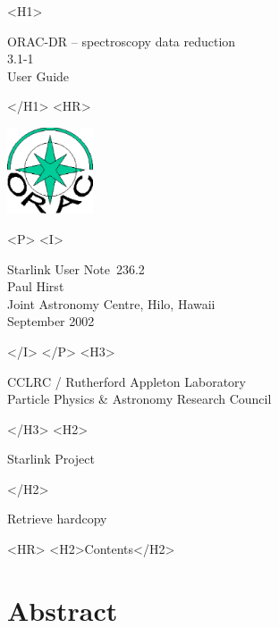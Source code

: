 \documentclass[twoside,11pt]{article}
\newcommand{\stardoccategory}  {Starlink User Note}
\newcommand{\stardocsource}    {sun\stardocnumber}
\newcommand{\stardocnumber}    {236.2}
\newcommand{\stardocauthors}   {Paul Hirst \\
                                Joint Astronomy Centre, Hilo, Hawaii}
\newcommand{\stardocdate}      {September 2002}
\newcommand{\stardoctitle}     {ORAC-DR -- spectroscopy data reduction}
\newcommand{\stardocversion}   {3.1-1}
\newcommand{\stardocmanual}    {User Guide}
\newcommand{\htmladdnormallink}[2]{#1}
\newcommand{\htmladdimg}[1]{}
\newcommand{\htmlref}[2]{#1}
\newcommand{\htmladdtonavigation}[1]{}
\newcommand{\xlabel}[1]{}
\renewcommand{\_}{\texttt{\symbol{95}}}
\begin{document}
\begin{htmlonly}
   \xlabel{}
   \begin{rawhtml} <H1> \end{rawhtml}
      \stardoctitle\\
      \stardocversion\\
      \stardocmanual
   \begin{rawhtml} </H1> <HR> \end{rawhtml}

\includegraphics[width=1.0in]{sun236_logo.eps}

   \begin{rawhtml} <P> <I> \end{rawhtml}
   \stardoccategory\ \stardocnumber \\
   \stardocauthors \\
   \stardocdate
   \begin{rawhtml} </I> </P> <H3> \end{rawhtml}
      \htmladdnormallink{CCLRC / Rutherford Appleton Laboratory}
                        {http://www.cclrc.ac.uk} \\
      \htmladdnormallink{Particle Physics \& Astronomy Research Council}
                        {http://www.pparc.ac.uk} \\
   \begin{rawhtml} </H3> <H2> \end{rawhtml}
      \htmladdnormallink{Starlink Project}{http://www.starlink.rl.ac.uk/}
   \begin{rawhtml} </H2> \end{rawhtml}
   \htmladdnormallink{\htmladdimg{source.gif} Retrieve hardcopy}
      {http://www.starlink.rl.ac.uk/cgi-bin/hcserver?\stardocsource}\\

  \label{stardoccontents}
  \begin{rawhtml} 
    <HR>
    <H2>Contents</H2>
  \end{rawhtml}
  \htmladdtonavigation{\htmlref{\htmladdimg{contents_motif.gif}}
        {stardoccontents}}

  \section{\xlabel{abstract}Abstract}
\end{htmlonly}
\end{document}
